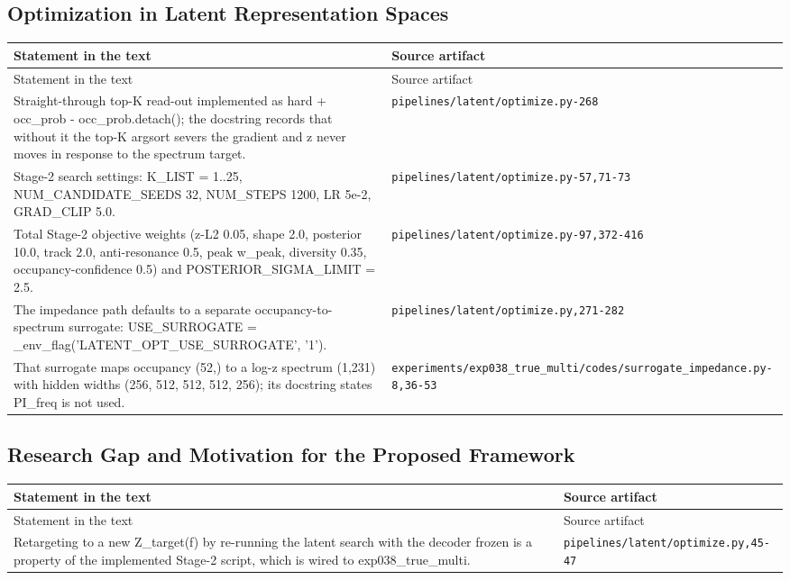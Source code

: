 \subsection*{Optimization in Latent Representation Spaces}
\begingroup\small
\begin{longtable}{p{} p{}}
\hline
Statement in the text & Source artifact \\
\hline
\endfirsthead
\hline
Statement in the text & Source artifact \\
\hline
\endhead
Straight-through top-K read-out implemented as hard + occ\_prob - occ\_prob.detach(); the docstring records that without it the top-K argsort severs the gradient and z never moves in response to the spectrum target. & \texttt{pipelines/\allowbreak{}latent/\allowbreak{}optimize.py-268} \\
Stage-2 search settings: K\_LIST = 1..25, NUM\_CANDIDATE\_SEEDS 32, NUM\_STEPS 1200, LR 5e-2, GRAD\_CLIP 5.0. & \texttt{pipelines/\allowbreak{}latent/\allowbreak{}optimize.py-57,71-73} \\
Total Stage-2 objective weights (z-L2 0.05, shape 2.0, posterior 10.0, track 2.0, anti-resonance 0.5, peak w\_peak, diversity 0.35, occupancy-confidence 0.5) and POSTERIOR\_SIGMA\_LIMIT = 2.5. & \texttt{pipelines/\allowbreak{}latent/\allowbreak{}optimize.py-97,372-416} \\
The impedance path defaults to a separate occupancy-to-spectrum surrogate: USE\_SURROGATE = \_env\_flag('LATENT\_OPT\_USE\_SURROGATE', '1'). & \texttt{pipelines/\allowbreak{}latent/\allowbreak{}optimize.py,271-282} \\
That surrogate maps occupancy (52,) to a log-z spectrum (1,231) with hidden widths (256, 512, 512, 512, 256); its docstring states PI\_freq is not used. & \texttt{experiments/\allowbreak{}exp038\_\allowbreak{}true\_\allowbreak{}multi/\allowbreak{}codes/\allowbreak{}surrogate\_\allowbreak{}impedance.py-8,36-53} \\
\hline
\end{longtable}
\endgroup

\subsection*{Research Gap and Motivation for the Proposed Framework}
\begingroup\small
\begin{longtable}{p{} p{}}
\hline
Statement in the text & Source artifact \\
\hline
\endfirsthead
\hline
Statement in the text & Source artifact \\
\hline
\endhead
Retargeting to a new Z\_target(f) by re-running the latent search with the decoder frozen is a property of the implemented Stage-2 script, which is wired to exp038\_true\_multi. & \texttt{pipelines/\allowbreak{}latent/\allowbreak{}optimize.py,45-47} \\
\hline
\end{longtable}
\endgroup

